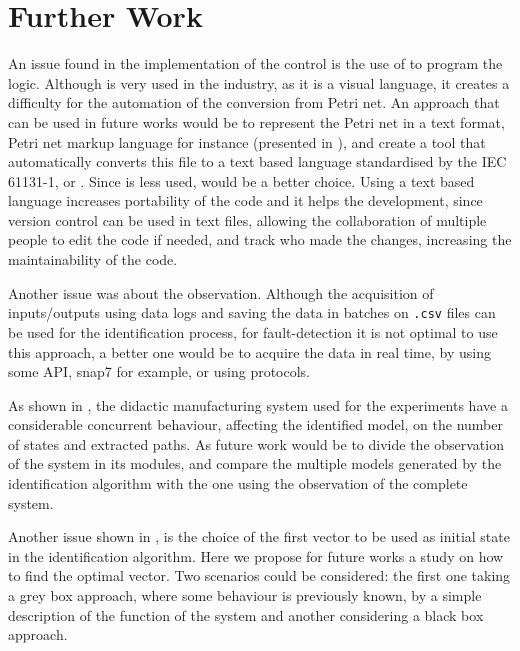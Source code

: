 \section{Further Work}
An issue found in the implementation of the control is the use of \LD{} to
program the logic. Although \LD{} is very used
in the industry, as it is a visual language, it creates a difficulty for the
automation of the conversion from Petri net. An approach that can be used in
future works would be to represent the Petri net in a text format, Petri net
markup language for instance (presented in \cite{weber2003petri}), and create a
tool that automatically converts this file to a text based language standardised
by the IEC 61131-1, \IL{} or \ST{}. Since \IL{} is less used, \ST{}
would be a better choice. Using a text based language increases portability
of the code and it helps the development, since version control can be used in
text files, allowing the collaboration of multiple people to edit the code if
needed, and track who made the changes, increasing the maintainability
of the code.



Another issue was about the observation. Although the acquisition of
inputs\slash outputs using data logs and saving the data in batches on
\verb|.csv| files can be used for the identification process, for
fault-detection it is not optimal to use this approach, a better one would be to
acquire the data in real time, by using some API, snap7 for example, or using
\SCADA{} protocols.

As shown in , the didactic manufacturing system used for the
experiments have a considerable concurrent behaviour, affecting the identified
model, on the number of states and extracted paths. As future work would be to divide the observation of the system in its modules, and
compare the multiple models generated by the identification algorithm with the
one using the observation of the complete system.

Another issue shown in , is the choice of the first
vector to be used as initial state in the identification algorithm. Here we
propose for future works a study on how to find the optimal vector. Two
scenarios could be considered: the first one taking a grey box approach, where some behaviour
is previously known, by a simple description of the function of the system and another considering a black box approach.

